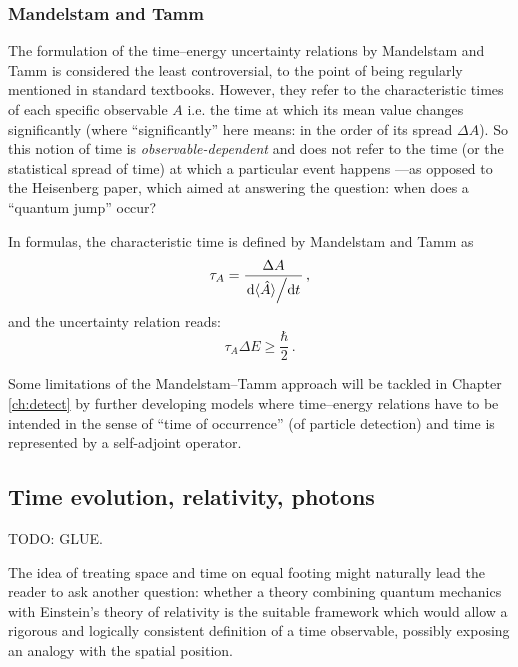 \subsubsection{Mandelstam and Tamm}

The formulation of the time--energy uncertainty relations by Mandelstam and Tamm
\parencite{MandelstamTamm} is considered the least controversial, to the point
of being regularly mentioned in standard textbooks. However,
they refer to the characteristic times of each specific observable $A$ i.e.
the time at which its mean value changes significantly (where ``significantly''
here means: in the order of its spread $\Delta{A}$). So this notion of time
is \emph{observable-dependent} and does not refer to the time (or the statistical spread of time)
at which a particular event happens
---as opposed to the Heisenberg paper, which aimed at answering the question: when does
a ``quantum jump'' occur?

In formulas, the characteristic time is defined by Mandelstam and Tamm as
\begin{equation}
  \tau_{A} = \frac{ \Delta{A} } { \dv*{\langle\hat{A}\rangle}{t} } \, \text{,}
\end{equation}
and the uncertainty relation reads:
\begin{equation}
  \tau_{A}\Delta{E} \ge \frac{\hbar}{2} \, \text{.}
\end{equation}

Some limitations of the Mandelstam--Tamm
approach
will be tackled
in
Chapter \ref{ch:detect}
by further developing
models where time--energy relations have to be intended in the sense
of ``time of occurrence'' (of particle detection)
and time is represented
by a self-adjoint operator.

\subsection{Time evolution, relativity, photons}\label{sec:trel}

TODO: GLUE.

The idea of treating space and time on equal footing might naturally lead the reader to
ask another question: whether a theory combining quantum mechanics with Einstein's
theory of relativity is the suitable framework which would allow a rigorous and logically consistent
definition of a time observable,
possibly exposing an analogy with the spatial position.

